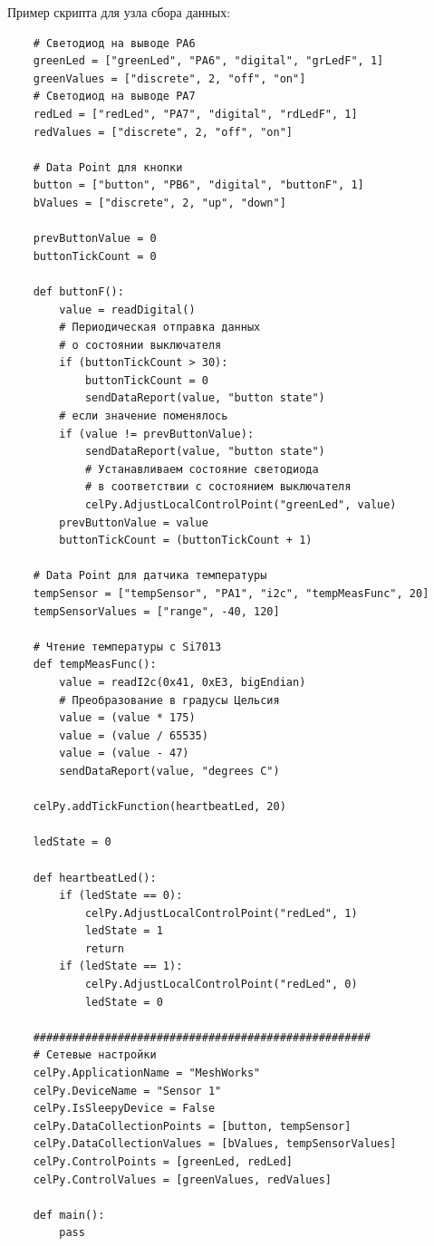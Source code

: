 \documentclass[12pt]{article}
\begin{document}
Пример скрипта для узла сбора данных:
\begin{verbatim}
    # Светодиод на выводе PA6 
    greenLed = ["greenLed", "PA6", "digital", "grLedF", 1]
    greenValues = ["discrete", 2, "off", "on"]
    # Светодиод на выводе PA7 
    redLed = ["redLed", "PA7", "digital", "rdLedF", 1]
    redValues = ["discrete", 2, "off", "on"]
      
    # Data Point для кнопки
    button = ["button", "PB6", "digital", "buttonF", 1] 
    bValues = ["discrete", 2, "up", "down"] 
    
    prevButtonValue = 0
    buttonTickCount = 0 
      
    def buttonF():
        value = readDigital()
        # Периодическая отправка данных
        # о состоянии выключателя
        if (buttonTickCount > 30):
            buttonTickCount = 0
            sendDataReport(value, "button state")
        # если значение поменялось 
        if (value != prevButtonValue):  
            sendDataReport(value, "button state")
            # Устанавливаем состояние светодиода
            # в соответствии с состоянием выключателя
            celPy.AdjustLocalControlPoint("greenLed", value)    
        prevButtonValue = value
        buttonTickCount = (buttonTickCount + 1)
        
    # Data Point для датчика температуры
    tempSensor = ["tempSensor", "PA1", "i2c", "tempMeasFunc", 20]
    tempSensorValues = ["range", -40, 120]
    
    # Чтение температуры с Si7013
    def tempMeasFunc():
        value = readI2c(0x41, 0xE3, bigEndian)
        # Преобразование в градусы Цельсия
        value = (value * 175)
        value = (value / 65535)
        value = (value - 47)
        sendDataReport(value, "degrees C")
    
    celPy.addTickFunction(heartbeatLed, 20) 
      
    ledState = 0
      
    def heartbeatLed(): 
        if (ledState == 0): 
            celPy.AdjustLocalControlPoint("redLed", 1)
            ledState = 1
            return
        if (ledState == 1): 
            celPy.AdjustLocalControlPoint("redLed", 0)
            ledState = 0
      
    ####################################################
    # Сетевые настройки
    celPy.ApplicationName = "MeshWorks"  
    celPy.DeviceName = "Sensor 1" 
    celPy.IsSleepyDevice = False
    celPy.DataCollectionPoints = [button, tempSensor] 
    celPy.DataCollectionValues = [bValues, tempSensorValues]
    celPy.ControlPoints = [greenLed, redLed]
    celPy.ControlValues = [greenValues, redValues] 
      
    def main(): 
        pass
\end{verbatim}
\end{document}
